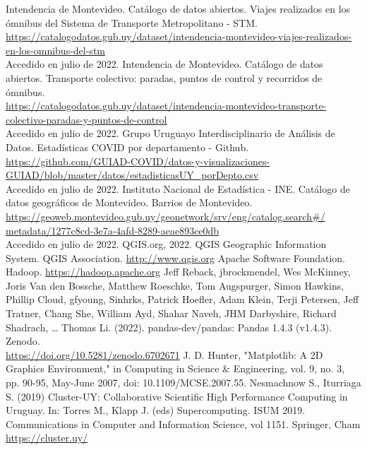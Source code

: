 \documentclass[conference]{IEEEtran}
\begin{document}
\begin{thebibliography}{00}
 Intendencia de Montevideo. Catálogo de datos abiertos. Viajes realizados en los ómnibus del Sistema de Transporte Metropolitano - STM. \\ \href{https://catalogodatos.gub.uy/dataset/intendencia-montevideo-viajes-realizados-en-los-omnibus-del-stm}{https://catalogodatos.gub.uy/dataset/intendencia-montevideo-viajes-realizados-en-los-omnibus-del-stm}\\
Accedido en julio de 2022.
 Intendencia de Montevideo. Catálogo de datos abiertos. Transporte colectivo: paradas, puntos de control y recorridos de ómnibus. \\ \href{https://catalogodatos.gub.uy/dataset/intendencia-montevideo-transporte-colectivo-paradas-y-puntos-de-control}{https://catalogodatos.gub.uy/dataset/intendencia-montevideo-transporte-colectivo-paradas-y-puntos-de-control}\\
Accedido en julio de 2022.
 Grupo Uruguayo Interdisciplinario de Análisis de Datos. Estadísticas COVID por departamento - Github.\\
\href{https://github.com/GUIAD-COVID/datos-y-visualizaciones-GUIAD/blob/master/datos/estadisticasUY_porDepto.csv}{https://github.com/GUIAD-COVID/datos-y-visualizaciones-GUIAD/blob/master/datos/estadisticasUY\_porDepto.csv}\\
Accedido en julio de 2022.
 Instituto Nacional de Estadística - INE. Catálogo de datos geográficos de Montevideo. Barrios de Montevideo. \\ \href{https://geoweb.montevideo.gub.uy/geonetwork/srv/eng/catalog.search#/metadata/1277c8cd-3e7a-4afd-8289-aeae893ce0db}{https://geoweb.montevideo.gub.uy/geonetwork/srv/eng/catalog.search\#/\\
metadata/1277c8cd-3e7a-4afd-8289-aeae893ce0db}\\
Accedido en julio de 2022.
QGIS.org, 2022. QGIS Geographic Information System. QGIS Association. \href{http://www.qgis.org}{http://www.qgis.org}
Apache Software Foundation. Hadoop. \href{https://hadoop.apache.org}{https://hadoop.apache.org}
Jeff Reback, jbrockmendel, Wes McKinney, Joris Van den Bossche, Matthew Roeschke, Tom Augspurger, Simon Hawkins, Phillip Cloud, gfyoung, Sinhrks, Patrick Hoefler, Adam Klein, Terji Petersen, Jeff Tratner, Chang She, William Ayd, Shahar Naveh, JHM Darbyshire, Richard Shadrach, … Thomas Li. (2022). pandas-dev/pandas: Pandas 1.4.3 (v1.4.3). Zenodo.\\ \href{https://doi.org/10.5281/zenodo.6702671}{https://doi.org/10.5281/zenodo.6702671}
J. D. Hunter, "Matplotlib: A 2D Graphics Environment," in Computing in Science \& Engineering, vol. 9, no. 3, pp. 90-95, May-June 2007, doi: 10.1109/MCSE.2007.55.
 Nesmachnow S., Iturriaga S. (2019) Cluster-UY: Collaborative Scientific High Performance Computing in Uruguay. In: Torres M., Klapp J. (eds) Supercomputing. ISUM 2019. Communications in Computer and Information Science, vol 1151. Springer, Cham\\
\href{https://cluster.uy/}{https://cluster.uy/}
\end{thebibliography}
\end{document}
